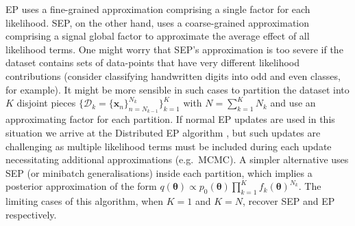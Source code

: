 EP uses a fine-grained approximation comprising a single factor for each likelihood. SEP, on the other hand, uses a coarse-grained approximation comprising a signal global factor to approximate the average effect of all likelihood terms. One might worry that SEP's approximation is too severe if the dataset contains sets of data-points that have very different likelihood contributions (consider classifying handwritten digits into odd and even classes, for example). It might be more sensible in such cases to partition the dataset into $K$ disjoint pieces $\{ \mathcal{D}_k = \{\bm{x}_n\}_{n=N_{k-1}}^{N_k} \}_{k=1}^{K}$ with $N = \sum_{k=1}^K N_k$ and use an approximating factor for each partition. If normal EP updates are used in this situation we arrive at the Distributed EP algorithm \cite{gelman:dep}\cite{xu:sms}, but such updates are challenging as multiple likelihood terms must be included during each update necessitating additional approximations (e.g.~MCMC). A simpler alternative uses SEP (or minibatch generalisations) inside each partition, which implies a posterior approximation of the form $q(\bm{\theta}) \propto p_0(\bm{\theta}) \prod_{k=1}^K f_{k}(\bm{\theta})^{N_k}$. The limiting cases of this algorithm, when $K=1$ and $K=N$, recover SEP and EP respectively. 


%
%


